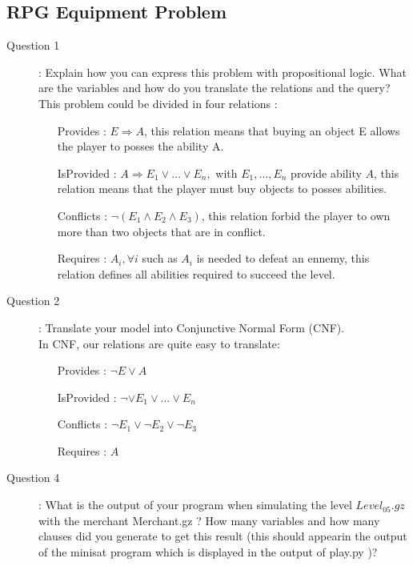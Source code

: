 \subsection{RPG Equipment Problem}
\begin{description}
\item[Question 1]: Explain how you can express this problem with propositional logic. What are the variables and how do you translate the relations and the query?\\
This problem could be divided in four relations : 
\begin{itemize}
\item[Provides]: $E \Rightarrow A$, this relation means that buying an object E allows the player to posses the ability A.
\item[IsProvided]: $A  \Rightarrow E_1 \vee \ldots \vee E_n,$ with $  E_1,\ldots,E_n$ provide ability $A$, this relation means that the player must buy objects to posses abilities.
\item[Conflicts]: $ \neg (E_1 \wedge E_2 \wedge E_3) $, this relation forbid the player to own more than two objects that are in conflict.
\item[Requires]: $ A_i, \forall i$ such as $A_i$ is needed to defeat an ennemy, this relation defines all abilities required to succeed the level.
\end{itemize}
\item[Question 2]: Translate your model into Conjunctive Normal Form (CNF).\\
In CNF, our relations are quite easy to translate:
\begin{itemize}
\item[Provides]: $\neg E \vee A$
\item[IsProvided]: $\neg \vee E_1 \vee \ldots \vee E_n $
\item[Conflicts]: $\neg E_1 \vee \neg E_2 \vee \neg E_3$
\item[Requires]: $A$ 
\end{itemize}
\newpage
\item[Question 4]: What is the output of your program when simulating the level $Level_05.gz$ with the merchant Merchant.gz ? How many variables and how many clauses did you generate to get this result (this should appearin the output of the minisat program which is displayed in the output of play.py )?\\
\begin{verbatim} 


\end{verbatim}
\end{description}
